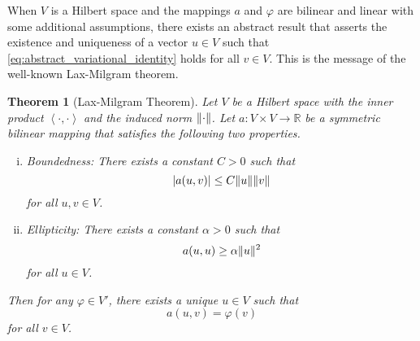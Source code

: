 \documentclass[english, 12pt, a4paper, sci, utf8, a-2b, online]{aaltothesis}
\theoremstyle{definition}
\theoremstyle{plain}
\newtheorem{theorem}{Theorem}[section]
\DeclarePairedDelimiter\abs{\lvert}{\rvert}
\DeclarePairedDelimiter\norm{\lVert}{\rVert}
\newcommand*{\innerprod}[2]{\left\langle #1, #2 \right\rangle}
\numberwithin{equation}{section}
\begin{document}
When $V$ is a Hilbert space and the mappings $a$ and $\varphi$ are bilinear
and linear with some additional assumptions, there exists an abstract result
that asserts the existence and uniqueness of a vector $u \in V$ such that
\eqref{eq:abstract_variational_identity} holds for all $v \in V$.
This is the message of the well-known Lax-Milgram theorem.
\begin{theorem}[Lax-Milgram Theorem]
    \label{thm:lax_milgram}
    Let $V$ be a Hilbert space with the inner product $\innerprod{\cdot}{\cdot}$
    and the induced norm $\norm{\cdot}$.
    Let $a: V \times V \to \mathbb{R}$ be a symmetric bilinear
    mapping that satisfies the following two properties.
    \begin{enumerate}[(i)]
        \item Boundedness: There exists a constant $C > 0$ such that
        \begin{equation*}
            \abs{a(u,v)} \leq C \norm{u} \norm{v}
        \end{equation*}
        for all $u,v \in V$.
        \item Ellipticity: There exists a constant $\alpha > 0$ such that
        \begin{equation*}
            a(u,u) \geq \alpha \norm{u}^2
        \end{equation*}
        for all $u \in V$.
    \end{enumerate}
    Then for any $\varphi \in V'$, there exists a unique $u \in V$ such that
    \begin{equation*}
        a(u,v) = \varphi(v)
    \end{equation*}
    for all $v \in V$.
\end{theorem}
\end{document}
